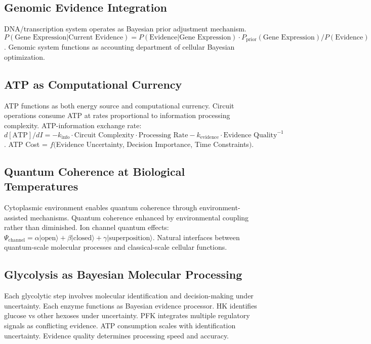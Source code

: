 \documentclass[12pt,a4paper]{article}
\begin{document}
\subsection{Genomic Evidence Integration}

DNA/transcription system operates as Bayesian prior adjustment mechanism. $P(\text{Gene Expression} | \text{Current Evidence}) = P(\text{Evidence} | \text{Gene Expression}) \cdot P_{\text{prior}}(\text{Gene Expression}) / P(\text{Evidence})$. Genomic system functions as accounting department of cellular Bayesian optimization.

\subsection{ATP as Computational Currency}

ATP functions as both energy source and computational currency. Circuit operations consume ATP at rates proportional to information processing complexity. ATP-information exchange rate: $d[\text{ATP}]/dI = -k_{\text{info}} \cdot \text{Circuit Complexity} \cdot \text{Processing Rate} - k_{\text{evidence}} \cdot \text{Evidence Quality}^{-1}$. ATP Cost = $f($Evidence Uncertainty, Decision Importance, Time Constraints$)$.

\subsection{Quantum Coherence at Biological Temperatures}

Cytoplasmic environment enables quantum coherence through environment-assisted mechanisms. Quantum coherence enhanced by environmental coupling rather than diminished. Ion channel quantum effects: $\Psi_{\text{channel}} = \alpha|\text{open}\rangle + \beta|\text{closed}\rangle + \gamma|\text{superposition}\rangle$. Natural interfaces between quantum-scale molecular processes and classical-scale cellular functions.

\subsection{Glycolysis as Bayesian Molecular Processing}

Each glycolytic step involves molecular identification and decision-making under uncertainty. Each enzyme functions as Bayesian evidence processor. HK identifies glucose vs other hexoses under uncertainty. PFK integrates multiple regulatory signals as conflicting evidence. ATP consumption scales with identification uncertainty. Evidence quality determines processing speed and accuracy.
\end{document}
